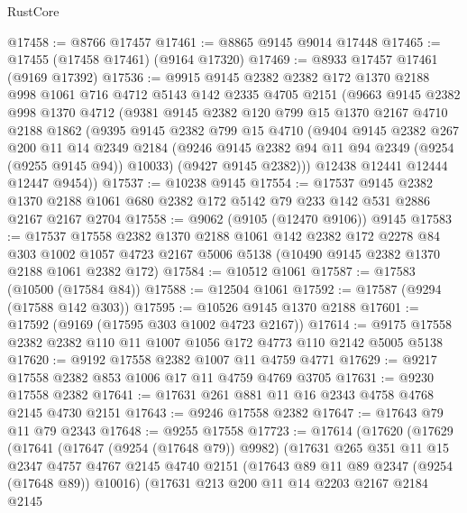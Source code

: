 \begin{lexlean}{RustCore}
\begin{coremodule}
@17458 := @8766 @17457
@17461 := @8865 @9145 @9014 @17448
@17465 := @17455 (@17458 @17461) (@9164 @17320)
@17469 := @8933 @17457 @17461 (@9169 @17392)
@17536 := @9915
    @9145
    @2382
    @2382
    @172
    @1370
    @2188
    @998
    @1061
    @716
    @4712
    @5143
    @142
    @2335
    @4705
    @2151
    (@9663
      @9145
      @2382
      @998
      @1370
      @4712
      (@9381
        @9145
        @2382
        @120
        @799
        @15
        @1370
        @2167
        @4710
        @2188
        @1862
        (@9395
          @9145
          @2382
          @799
          @15
          @4710
          (@9404
            @9145
            @2382
            @267
            @200
            @11
            @14
            @2349
            @2184
            (@9246 @9145 @2382 @94 @11 @94 @2349 (@9254 (@9255 @9145 @94)) @10033)
            (@9427 @9145 @2382)))
        @12438
        @12441
        @12444
        @12447
        @9454))
@17537 := @10238 @9145
@17554 := @17537
    @9145
    @2382
    @1370
    @2188
    @1061
    @680
    @2382
    @172
    @5142
    @79
    @233
    @142
    @531
    @2886
    @2167
    @2167
    @2704
@17558 := @9062 (@9105 (@12470 @9106)) @9145
@17583 := @17537
    @17558
    @2382
    @1370
    @2188
    @1061
    @142
    @2382
    @172
    @2278
    @84
    @303
    @1002
    @1057
    @4723
    @2167
    @5006
    @5138
    (@10490 @9145 @2382 @1370 @2188 @1061 @2382 @172)
@17584 := @10512 @1061
@17587 := @17583 (@10500 (@17584 @84))
@17588 := @12504 @1061
@17592 := @17587 (@9294 (@17588 @142 @303))
@17595 := @10526 @9145 @1370 @2188
@17601 := @17592 (@9169 (@17595 @303 @1002 @4723 @2167))
@17614 := @9175 @17558 @2382 @2382 @110 @11 @1007 @1056 @172 @4773 @110 @2142 @5005 @5138
@17620 := @9192 @17558 @2382 @1007 @11 @4759 @4771
@17629 := @9217 @17558 @2382 @853 @1006 @17 @11 @4759 @4769 @3705
@17631 := @9230 @17558 @2382
@17641 := @17631 @261 @881 @11 @16 @2343 @4758 @4768 @2145 @4730 @2151
@17643 := @9246 @17558 @2382
@17647 := @17643 @79 @11 @79 @2343
@17648 := @9255 @17558
@17723 := @17614
    (@17620
      (@17629
        (@17641
          (@17647 (@9254 (@17648 @79)) @9982)
          (@17631
            @265
            @351
            @11
            @15
            @2347
            @4757
            @4767
            @2145
            @4740
            @2151
            (@17643 @89 @11 @89 @2347 (@9254 (@17648 @89)) @10016)
            (@17631
              @213
              @200
              @11
              @14
              @2203
              @2167
              @2184
              @2145

\end{coremodule}
\end{lexlean}
